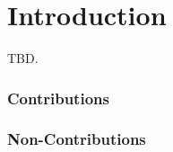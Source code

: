 \chapter{Introduction}
\label{chapter:Introduction}
TBD.

\subsection{Contributions}
\subsection{Non-Contributions}